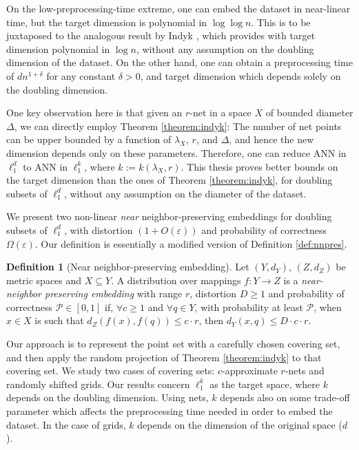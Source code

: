 \documentclass[10pt,a4paper,twoside]{book}
\newcommand{\eps}{\varepsilon}
\theoremstyle{definition}
\newtheorem{definition}{Definition}[chapter]
\theoremstyle{remark}
\begin{document}
On the low-preprocessing-time extreme, one can embed the dataset in near-linear time, but the target dimension is polynomial in $\log \log n$. This is to be juxtaposed to the analogous result by Indyk \cite{Ind06}, which provides with target dimension  polynomial in $\log n$, without any assumption on the doubling dimension of the dataset. On the other hand, one can obtain a preprocessing time of $dn^{1+\delta}$ for any constant $\delta>0$, and target dimension which depends solely on the doubling dimension. 

One key observation here is that given an $r$-net in a space $X$ of bounded diameter $\Delta$, we can directly employ Theorem \ref{theorem:indyk}: The number of net points can be upper bounded by a function of $\lambda_X$, $r$, and $\Delta$, and hence the new dimension depends only on these parameters. Therefore, one can reduce ANN in $\ell_1^d$ to ANN in $\ell_1^k$, where $k:=k(\lambda_X,r)$. This thesis proves better bounds on the target dimension than the ones of Theorem \ref{theorem:indyk}, for doubling subsets of $\ell_1^d$, without any assumption on the diameter of the dataset.

\iffalse
We present two non-linear \textit{near} neighbor-preserving embeddings for doubling subsets of $\ell_1^d$, with distortion $(1+O(\eps))$ and probability of correctness $\Omega(\eps)$. Our definition is essentially a modified version of Definition \ref{def:nnpres}.

\begin{definition}[Near neighbor-preserving embedding]  \label{Dnnpres}
Let $(Y,d_Y)$, $(Z,d_Z)$ be metric spaces and $X \subseteq Y$.
A distribution over mappings $f:Y \rightarrow Z$ is
a {\em near-neighbor preserving embedding} with range $r$, distortion $D \geq 1$
and probability of correctness $\mathcal{P} \in [0,1]$ if,
$\forall c \geq 1$ and $\forall q\in Y$, with probability at least $\mathcal{P}$, 
when $x\in X$ is such that $d_Z(f(x),f(q))\leq c \cdot r$, then $d_Y(x,q)\leq D \cdot c \cdot r$.
\end{definition}

Our approach is to represent the point set with a carefully chosen covering set, and then apply the random projection of Theorem \ref{theorem:indyk} to that covering set. We study two cases of covering sets: $c$-approximate $r$-nets and randomly shifted grids. 
Our results concern $\ell_1^k$ as the target space, where $k$ depends on the doubling dimension. Using nets, $k$ depends also on some trade-off parameter which affects the preprocessing time needed in order to embed the dataset. In the case of grids, $k$ depends on the dimension of the original space ($d$).
\end{document}
